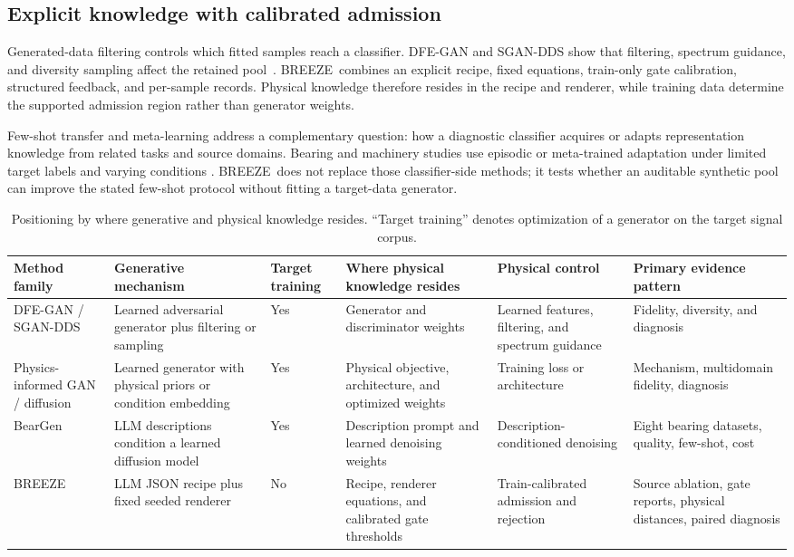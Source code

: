 \documentclass[a4paper,fleqn]{cas-sc}
\newcommand{\breeze}{BREEZE}
\begin{document}
\subsection{Explicit knowledge with calibrated admission}

Generated-data filtering controls which fitted samples reach a classifier.
DFE-GAN and SGAN-DDS show that filtering, spectrum guidance, and diversity
sampling affect the retained pool~\citep{liu2022dfegan,kim2024sgan}. \breeze\
combines an explicit recipe, fixed equations, train-only gate calibration,
structured feedback, and per-sample records. Physical knowledge therefore
resides in the recipe and renderer, while training data determine the supported
admission region rather than generator weights.

Few-shot transfer and meta-learning address a complementary question: how a
diagnostic classifier acquires or adapts representation knowledge from related
tasks and source domains. Bearing and machinery studies use episodic or
meta-trained adaptation under limited target labels and varying conditions
\citep{li2021mlfd,wu2020fewshot,su2022drhrml,feng2022metafd}. \breeze\ does not
replace those classifier-side methods; it tests whether an auditable synthetic
pool can improve the stated few-shot protocol without fitting a target-data
generator.

\begin{table}[t]
\centering
\caption{Positioning by where generative and physical knowledge resides.
``Target training'' denotes optimization of a generator on the target signal
corpus.}
\label{tab:positioning}
\footnotesize
\setlength{\tabcolsep}{3pt}
\begin{tabular}{@{}>{\raggedright\arraybackslash}p{1.8cm}>{\raggedright\arraybackslash}p{2.5cm}>{\raggedright\arraybackslash}p{1.35cm}>{\raggedright\arraybackslash}p{2.6cm}>{\raggedright\arraybackslash}p{2.3cm}>{\raggedright\arraybackslash}p{3.3cm}@{}}
\toprule
Method family & Generative mechanism & Target training & Where physical knowledge resides & Physical control & Primary evidence pattern \\
\midrule
DFE-GAN / SGAN-DDS & Learned adversarial generator plus filtering or sampling & Yes & Generator and discriminator weights & Learned features, filtering, and spectrum guidance & Fidelity, diversity, and diagnosis \\
Physics-informed GAN / diffusion & Learned generator with physical priors or condition embedding & Yes & Physical objective, architecture, and optimized weights & Training loss or architecture & Mechanism, multidomain fidelity, diagnosis \\
BearGen & LLM descriptions condition a learned diffusion model & Yes & Description prompt and learned denoising weights & Description-conditioned denoising & Eight bearing datasets, quality, few-shot, cost \\
\breeze & LLM JSON recipe plus fixed seeded renderer & No & Recipe, renderer equations, and calibrated gate thresholds & Train-calibrated admission and rejection & Source ablation, gate reports, physical distances, paired diagnosis \\
\bottomrule
\end{tabular}
\end{table}
\end{document}
